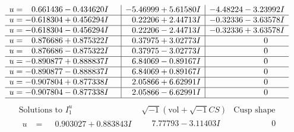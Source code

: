 \documentclass[1p]{elsarticle_modified}
\theoremstyle{definition}
\newcommand{\I}{\sqrt{-1}}
\begin{document}
$$\begin{array}{c|c|c}
\begin{aligned}
u &= \phantom{-}0.661436 - 0.434620 I\end{aligned}
 & -5.46999 + 5.61580 I & -4.48224 - 3.23992 I \\ \hline\begin{aligned}
u &= -0.618304 + 0.456294 I\end{aligned}
 & \phantom{-}0.22206 + 2.44713 I & -0.32336 - 3.63578 I \\ \hline\begin{aligned}
u &= -0.618304 - 0.456294 I\end{aligned}
 & \phantom{-}0.22206 - 2.44713 I & -0.32336 + 3.63578 I \\ \hline\begin{aligned}
u &= \phantom{-}0.876686 + 0.875322 I\end{aligned}
 & \phantom{-}0.37975 + 3.02773 I & \phantom{-0.000000 } 0 \\ \hline\begin{aligned}
u &= \phantom{-}0.876686 - 0.875322 I\end{aligned}
 & \phantom{-}0.37975 - 3.02773 I & \phantom{-0.000000 } 0 \\ \hline\begin{aligned}
u &= -0.890877 + 0.888837 I\end{aligned}
 & \phantom{-}6.84069 - 0.89167 I & \phantom{-0.000000 } 0 \\ \hline\begin{aligned}
u &= -0.890877 - 0.888837 I\end{aligned}
 & \phantom{-}6.84069 + 0.89167 I & \phantom{-0.000000 } 0 \\ \hline\begin{aligned}
u &= -0.907804 + 0.877338 I\end{aligned}
 & \phantom{-}2.05866 + 6.62991 I & \phantom{-0.000000 } 0 \\ \hline\begin{aligned}
u &= -0.907804 - 0.877338 I\end{aligned}
 & \phantom{-}2.05866 - 6.62991 I & \phantom{-0.000000 } 0\\
 \hline 
 \end{array}$$\newpage$$\begin{array}{c|c|c}  
\text{Solutions to }I^u_{1}& \I (\text{vol} + \sqrt{-1}CS) & \text{Cusp shape}\\
 \hline 
\begin{aligned}
u &= \phantom{-}0.903027 + 0.883843 I\end{aligned}
 & \phantom{-}7.77793 - 3.11403 I & \phantom{-0.000000 } 0 \\ \hline\begin{aligned}

\end{aligned}
\end{array}$$
\end{document}
